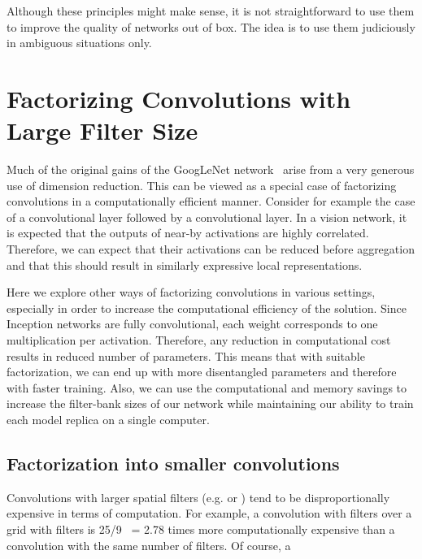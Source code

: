 \documentclass[10pt,twocolumn,letterpaper]{article}
\begin{document}
Although these principles might make sense, it is not straightforward to use
them to improve the quality of networks out of box. The idea is to use them
judiciously in ambiguous situations only.
 \section{Factorizing Convolutions with Large Filter Size}

Much of the original gains of the  GoogLeNet network~\cite{szegedy2015going}
arise from a very generous use of dimension reduction. This can be viewed
as a special case of factorizing convolutions in a computationally efficient
manner. Consider for example the case of a  convolutional layer
followed by a  convolutional layer.
In a vision network, it is expected that the outputs
of near-by activations are highly correlated. Therefore,
we can expect that their activations can be reduced before
aggregation and that this should result in
similarly expressive local representations.

Here we explore other
ways of factorizing convolutions in various settings, especially in order to
increase the computational efficiency of the solution. Since Inception networks
are fully convolutional, each weight corresponds to one multiplication per
activation. Therefore, any reduction in computational cost results in reduced
number of parameters. This means that with suitable factorization, we can end up
with more disentangled parameters and therefore with faster training.
Also, we can use the computational and memory savings to increase the
filter-bank sizes of our network while maintaining our ability to train
each model replica on a single computer.

\subsection{Factorization into smaller convolutions}
\label{factorizing}
Convolutions with larger spatial filters (e.g.  or
) tend to be disproportionally expensive in terms of computation.
For example, a  convolution
with  filters over a grid with  filters is 25/9 ~= 2.78 times
more computationally expensive
than a  convolution with the same number of filters. Of course, a
\end{document}
